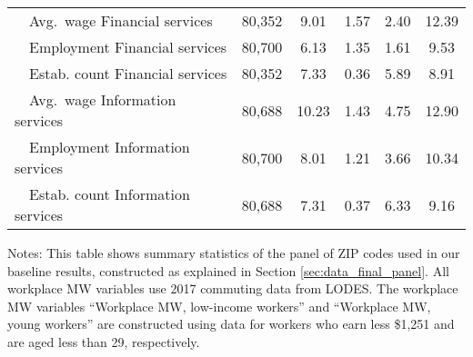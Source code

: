 \begin{table}[hbt!]
\begin{tabular}{@{}lccccc@{}}
        $\quad$Avg.\ wage Financial services          & 80,352  & 9.01  & 1.57  & 2.40  & 12.39  \\
        $\quad$Employment Financial services          & 80,700  & 6.13  & 1.35  & 1.61  & 9.53  \\
        $\quad$Estab. count Financial services        & 80,352  & 7.33  & 0.36  & 5.89  & 8.91  \\
        $\quad$Avg.\ wage Information services        & 80,688  & 10.23  & 1.43  & 4.75  & 12.90  \\
        $\quad$Employment Information services        & 80,700  & 8.01  & 1.21  & 3.66  & 10.34  \\
        $\quad$Estab. count Information services      & 80,688  & 7.31  & 0.37  & 6.33  & 9.16  \\ \bottomrule
    \end{tabular}

    \begin{minipage}{.95\textwidth} \footnotesize
        \vspace{2mm}
        Notes: This table shows summary statistics of the panel of ZIP codes 
        used in our baseline results, constructed as explained in Section 
        \ref{sec:data_final_panel}.
        All workplace MW variables use 2017 commuting data from LODES.
        The workplace MW variables ``Workplace MW, low-income workers'' and 
        ``Workplace MW, young workers'' are constructed using data for 
        workers who earn less \$1,251 and are aged less than 29, respectively.
    \end{minipage}
\end{table}
